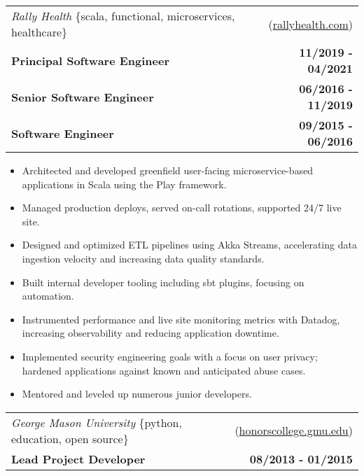 \documentclass[10pt,letterpaper]{article}
\begin{document}
\vspace{0.25cm}


\noindent\begin{tabularx}{\textwidth}{@{} Xr @{}}
  \textit{Rally Health} \{scala, functional, microservices, healthcare\} & (\href{https://www.rallyhealth.com}{rallyhealth.com}) \\
  \textbf{Principal Software Engineer} & \textbf{11/2019 - 04/2021} \\
  \textbf{Senior Software Engineer} & \textbf{06/2016 - 11/2019} \\
  \textbf{Software Engineer} & \textbf{09/2015 - 06/2016} \\
\end{tabularx}

\begin{itemize}
\item Architected and developed greenfield user-facing microservice-based applications in Scala \linebreak using the Play framework.
\item Managed production deploys, served on-call rotations, supported 24/7 live site.
\item Designed and optimized ETL pipelines using Akka Streams, accelerating data ingestion \linebreak velocity and increasing data quality standards.
\item Built internal developer tooling including sbt plugins, focusing on automation.
\item Instrumented performance and live site monitoring metrics with Datadog, increasing \linebreak observability and reducing application downtime.
\item Implemented security engineering goals with a focus on user privacy; hardened \linebreak applications against known and anticipated abuse cases.
\item Mentored and leveled up numerous junior developers.
\end{itemize}

\vspace{0.25cm}

\noindent\begin{tabularx}{\textwidth}{@{} Xr @{}}
  \textit{George Mason University} \{python, education, open source\} & (\href{https://honorscollege.gmu.edu}{honorscollege.gmu.edu}) \\
  \textbf{Lead Project Developer} & \textbf{08/2013 - 01/2015}
\end{tabularx}
\end{document}
